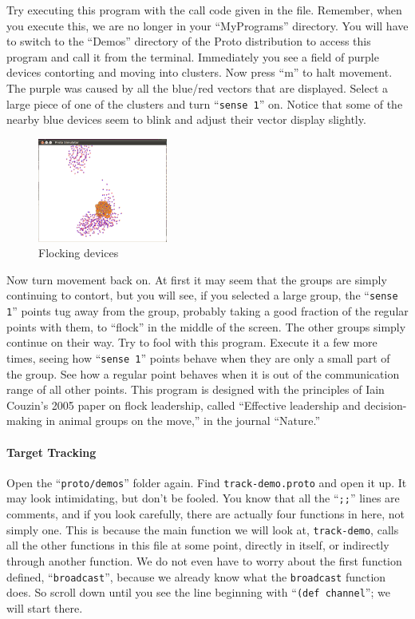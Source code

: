 \documentclass{article}
\newcommand\var[1]{{\tt #1}}
\newcommand\qvar[1]{``{\tt #1}''}
\begin{document}
Try executing this program with the call code given in the file.
Remember, when you execute this, we are no longer in your
``MyPrograms'' directory.  You will have to switch to the ``Demos''
directory of the Proto distribution to access this program and call it
from the terminal.  Immediately you see a field of purple devices
contorting and moving into clusters.  Now press ``m'' to halt
movement.  The purple was caused by all the blue/red vectors that are
displayed.  Select a large piece of one of the clusters and turn
\qvar{sense 1} on.  Notice that some of the nearby blue devices seem
to blink and adjust their vector display slightly.

\begin{figure}
  \includegraphics[width=0.38\textwidth]{figures/flock.png}
  \caption{Flocking devices}
  \label{f:flock}
\end{figure}

Now turn movement back on.  At first it may seem that the groups are
simply continuing to contort, but you will see, if you selected a
large group, the \qvar{sense 1} points tug away from the group,
probably taking a good fraction of the regular points with them, to
``flock'' in the middle of the screen.  The other groups simply
continue on their way.  Try to fool with this program.  Execute it a
few more times, seeing how \qvar{sense 1} points behave when they are
only a small part of the group.  See how a regular point behaves when
it is out of the communication range of all other points.  This
program is designed with the principles of Iain Couzin's 2005 paper on
flock leadership, called ``Effective leadership and decision-making in
animal groups on the move,'' in the journal ``Nature.''

\paragraph{Target Tracking}
Open the \qvar{proto/demos} folder again. Find \var{track-demo.proto}
and open it up.  It may look intimidating, but don't be fooled.  You
know that all the \qvar{;;} lines are comments, and if you look
carefully, there are actually four functions in here, not simply one.
This is because the main function we will look at, \var{track-demo},
calls all the other functions in this file at some point, directly in
itself, or indirectly through another function.  We do not even have
to worry about the first function defined, \qvar{broadcast}, because
we already know what the \var{broadcast} function does.  So scroll
down until you see the line beginning with \qvar{(def channel}; we
will start there.
\end{document}
